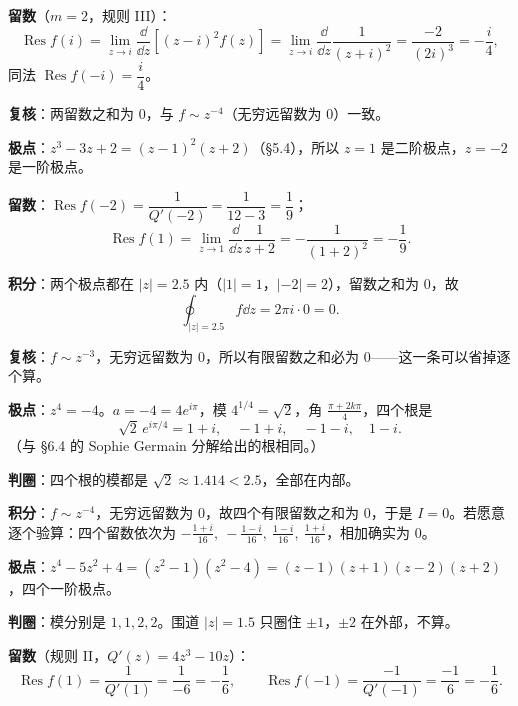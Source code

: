 \documentclass[11pt]{ctexart}
\renewcommand{\qbreak}{\needspace{0.32\textheight}}
\begin{document}
\textbf{留数}（$m=2$，规则 III）：
\[ \operatorname{Res}f(i)=\lim_{z\to i}\frac{\dd}{\dd z}\left[(z-i)^{2}f(z)\right]
=\lim_{z\to i}\frac{\dd}{\dd z}\frac{1}{(z+i)^{2}}
=\frac{-2}{(2i)^{3}}=-\frac{i}{4}, \]
同法 $\operatorname{Res}f(-i)=\dfrac{i}{4}$。

\textbf{复核}：两留数之和为 $0$，与 $f\sim z^{-4}$（无穷远留数为 $0$）一致。

\qbreak
{}

\textbf{极点}：$z^{3}-3z+2=(z-1)^{2}(z+2)$（§5.4），所以 $z=1$ 是二阶极点，$z=-2$ 是一阶极点。

\textbf{留数}：$\operatorname{Res}f(-2)=\dfrac{1}{Q'(-2)}=\dfrac{1}{12-3}=\dfrac19$；
\[ \operatorname{Res}f(1)=\lim_{z\to1}\frac{\dd}{\dd z}\frac{1}{z+2}=-\frac{1}{(1+2)^{2}}=-\frac19 . \]

\textbf{积分}：两个极点都在 $|z|=2.5$ 内（$|1|=1$，$|-2|=2$），留数之和为 $0$，故
\[ \oint_{|z|=2.5}f\dd z=2\pi i\cdot0=0 . \]

\textbf{复核}：$f\sim z^{-3}$，无穷远留数为 $0$，所以有限留数之和必为 $0$——这一条可以省掉逐个算。

\qbreak
{}

\textbf{极点}：$z^{4}=-4$。$a=-4=4e^{i\pi}$，模 $4^{1/4}=\sqrt2$，角 $\frac{\pi+2k\pi}{4}$，四个根是
\[ \sqrt2\,e^{i\pi/4}=1+i,\quad -1+i,\quad -1-i,\quad 1-i . \]
（与 §6.4 的 Sophie Germain 分解给出的根相同。）

\textbf{判圈}：四个根的模都是 $\sqrt2\approx1.414<2.5$，全部在内部。

\textbf{积分}：$f\sim z^{-4}$，无穷远留数为 $0$，故四个有限留数之和为 $0$，于是 $I=0$。若愿意逐个验算：四个留数依次为 $-\frac{1+i}{16},\ -\frac{1-i}{16},\ \frac{1-i}{16},\ \frac{1+i}{16}$，相加确实为 $0$。

\qbreak
{}

\textbf{极点}：$z^{4}-5z^{2}+4=(z^{2}-1)(z^{2}-4)=(z-1)(z+1)(z-2)(z+2)$，四个一阶极点。

\textbf{判圈}：模分别是 $1,1,2,2$。围道 $|z|=1.5$ 只圈住 $\pm1$，$\pm2$ 在外部，不算。

\textbf{留数}（规则 II，$Q'(z)=4z^{3}-10z$）：
\[ \operatorname{Res}f(1)=\frac{1}{Q'(1)}=\frac{1}{-6}=-\frac16,
\qquad \operatorname{Res}f(-1)=\frac{-1}{Q'(-1)}=\frac{-1}{6}=-\frac16 . \]
\end{document}
